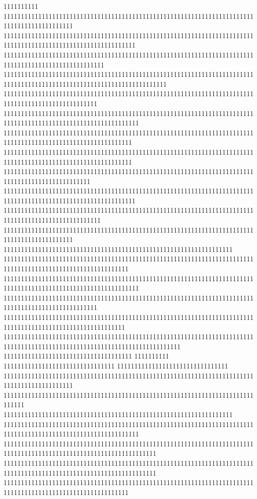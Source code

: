 1111111111
11111111111111111111111111111111111111111111111111111111111111111111111111111111111111111111
11111111111111111111111111111111111111111111111111111111111111111111111111111111111111111111111111111111111111
11111111111111111111111111111111111111111111111111111111111111111111111111111111111111111111111111111
11111111111111111111111111111111111111111111111111111111111111111111111111111111111111111111111111111111111111111111111
111111111111111111111111111111111111111111111111111111111111111111111111111111111111111111111111111
111111111111111111111111111111111111111111111111111111111111111111111111111111111111111111111111111111111111111
1111111111111111111111111111111111111111111111111111111111111111111111111111111111111111111111111111111111111
1111111111111111111111111111111111111111111111111111111111111111111111111111111111111111111111111111111111111
1111111111111111111111111111111111111111111111111111111111111111111111111111111111111111111111111
11111111111111111111111111111111111111111111111111111111111111111111111111111111111111111111111111111111111111
1111111111111111111111111111111111111111111111111111111111111111111111111111111111111111111111111111
11111111111111111111111111111111111111111111111111111111111111111111111111111111111111111111
111111111111111111111111111111111111111111111111111111111111111111
111111111111111111111111111111111111111111111111111111111111111111111111111111111111111111111111111111111111
111111111111111111111111111111111111111111111111111111111111111111111111111111111111111111111111111111111111111
111111111111111111111111111111111111111111111111111111111111111111111111111111111111111111111111111
11111111111111111111111111111111111111111111111111111111111111111111111111111111111111111111111111111111111
111111111111111111111111111111111111111111111111111111111111111111111111111111111111111111111111111111111111111111111111111
1111111111111111111111111111111111111
1111111111
11111111111111111111111111111111
11111111111111111111111111111111
11111111111111111111111111111111111111111111111111111111111111111111111111111111111111111111
111111111111111111111111111111111111111111111111111111111111111111111111111111
111111111111111111111111111111111111111111111111111111111111111111
111111111111111111111111111111111111111111111111111111111111111111111111111111111111111111111111111111111111111
11111111111111111111111111111111111111111111111111111111111111111111111111111111111111111111111111111111111111111111
11111111111111111111111111111111111111111111111111111111111111111111111111111111111111111111111111111111111111111111
111111111111111111111111111111111111111111111111111111111111111111111111111111111111111111111111111111111111
